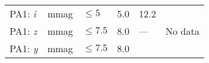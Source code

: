 \documentclass[DM,lsstdraft,toc]{lsstdoc}
\begin{document}
\begin{longtable}[]{@{}llllll@{}}
\begin{minipage}[t]{0.14\columnwidth}
PA1: \emph{i}\strut
\end{minipage} & \begin{minipage}[t]{0.06\columnwidth}\raggedright\strut
mmag\strut
\end{minipage} & \begin{minipage}[t]{0.17\columnwidth}\raggedright\strut
\(\leq 5\)\strut
\end{minipage} & \begin{minipage}[t]{0.17\columnwidth}\raggedright\strut
5.0\strut
\end{minipage} & \begin{minipage}[t]{0.12\columnwidth}\raggedright\strut
12.2\strut
\end{minipage} & \begin{minipage}[t]{0.17\columnwidth}\raggedright\strut
\strut
\end{minipage}\tabularnewline
\begin{minipage}[t]{0.14\columnwidth}\raggedright\strut
PA1: \emph{z}\strut
\end{minipage} & \begin{minipage}[t]{0.06\columnwidth}\raggedright\strut
mmag\strut
\end{minipage} & \begin{minipage}[t]{0.17\columnwidth}\raggedright\strut
\(\leq 7.5\)\strut
\end{minipage} & \begin{minipage}[t]{0.17\columnwidth}\raggedright\strut
8.0\strut
\end{minipage} & \begin{minipage}[t]{0.12\columnwidth}\raggedright\strut
---\strut
\end{minipage} & \begin{minipage}[t]{0.17\columnwidth}\raggedright\strut
No data\strut
\end{minipage}\tabularnewline
\begin{minipage}[t]{0.14\columnwidth}\raggedright\strut
PA1: \emph{y}\strut
\end{minipage} & \begin{minipage}[t]{0.06\columnwidth}\raggedright\strut
mmag\strut
\end{minipage} & \begin{minipage}[t]{0.17\columnwidth}\raggedright\strut
\(\leq 7.5\)\strut
\end{minipage} & \begin{minipage}[t]{0.17\columnwidth}\raggedright\strut
8.0\strut
\end{minipage} & \begin{minipage}[t]{0.12\columnwidth}\raggedright\strut

\end{minipage}
\end{longtable}
\end{document}
